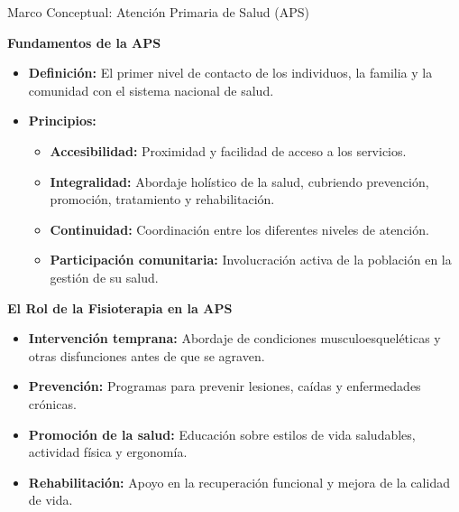 \documentclass[aspectratio=169]{beamer}
\begin{document}
\begin{frame}{Marco Conceptual: Atención Primaria de Salud (APS)}


\textbf{Fundamentos de la APS}
\begin{itemize}
  \item \textbf{Definición:} El primer nivel de contacto de los individuos, la familia y la comunidad con el sistema nacional de salud.
  \item \textbf{Principios:}
  \begin{itemize}
    \item \textbf{Accesibilidad:} Proximidad y facilidad de acceso a los servicios.
    \item \textbf{Integralidad:} Abordaje holístico de la salud, cubriendo prevención, promoción, tratamiento y rehabilitación.
    \item \textbf{Continuidad:} Coordinación entre los diferentes niveles de atención.
    \item \textbf{Participación comunitaria:} Involucración activa de la población en la gestión de su salud.
  \end{itemize}
\end{itemize}
\textbf{El Rol de la Fisioterapia en la APS}
\begin{itemize}
  \item \textbf{Intervención temprana:} Abordaje de condiciones musculoesqueléticas y otras disfunciones antes de que se agraven.
  \item \textbf{Prevención:} Programas para prevenir lesiones, caídas y enfermedades crónicas.
  \item \textbf{Promoción de la salud:} Educación sobre estilos de vida saludables, actividad física y ergonomía.
  \item \textbf{Rehabilitación:} Apoyo en la recuperación funcional y mejora de la calidad de vida.
\end{itemize}
\end{frame}
\end{document}
